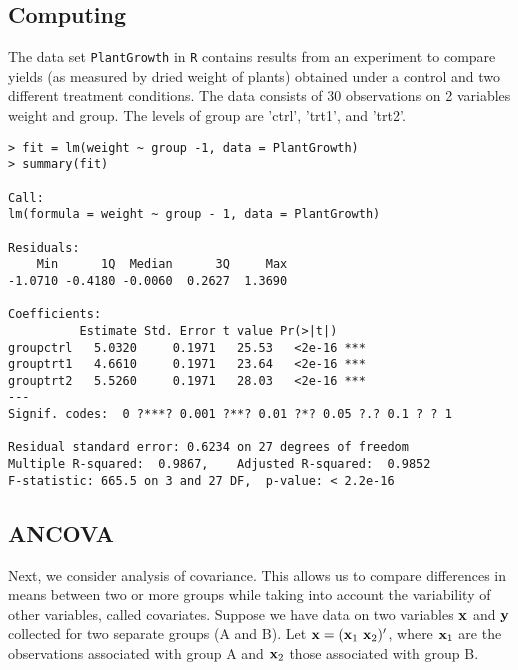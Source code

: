 

\subsection{Computing}

The data set {\tt{PlantGrowth}} in {\tt{R}} contains results from an experiment to compare yields (as measured by dried weight of plants) obtained under a control and two different treatment conditions. The data consists of 30 observations on 2 variables weight and group.  The levels of group are 'ctrl', 'trt1', and 'trt2'.

\begin{verbatim}
> fit = lm(weight ~ group -1, data = PlantGrowth)
> summary(fit)

Call:
lm(formula = weight ~ group - 1, data = PlantGrowth)

Residuals:
    Min      1Q  Median      3Q     Max 
-1.0710 -0.4180 -0.0060  0.2627  1.3690 

Coefficients:
          Estimate Std. Error t value Pr(>|t|)    
groupctrl   5.0320     0.1971   25.53   <2e-16 ***
grouptrt1   4.6610     0.1971   23.64   <2e-16 ***
grouptrt2   5.5260     0.1971   28.03   <2e-16 ***
---
Signif. codes:  0 ?***? 0.001 ?**? 0.01 ?*? 0.05 ?.? 0.1 ? ? 1

Residual standard error: 0.6234 on 27 degrees of freedom
Multiple R-squared:  0.9867,	Adjusted R-squared:  0.9852 
F-statistic: 665.5 on 3 and 27 DF,  p-value: < 2.2e-16

\end{verbatim}





\subsection{ANCOVA}


Next, we consider analysis of covariance. 
This allows us to compare differences in means between two or more groups while taking into account the variability of other variables, called covariates.
Suppose we have data on two variables $\mathbf{x}$ and $\mathbf{y}$ collected for two separate groups (A and B). 
Let $\mathbf{x} = (\mathbf{x}_1 \, \, \mathbf{x}_2)'$, where $\mathbf{x}_1$ are the observations associated with group A and $\mathbf{x}_2$ those associated with group B.

